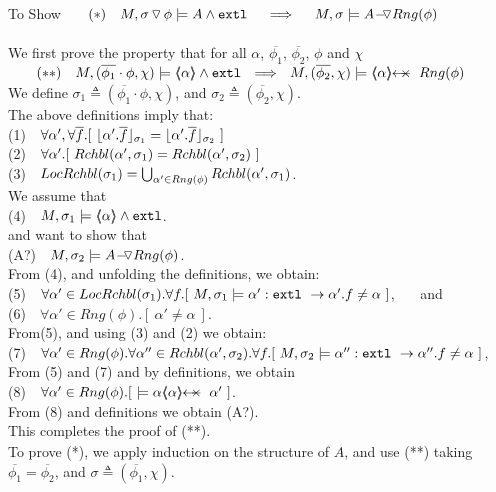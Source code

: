 $~$ \\
To Show \ \ \  $(*)\ \ \  M,  \PushSLong {\phi} {\sigma}   \models  A  \wedge \extThis    \ \  \ \  \Longrightarrow  \ \ \ \ M, \sigma \models \PushASLong  {Rng(\phi)} {A}$ 
\\ 
\SP \\
We first prove the property that for all $\alpha$,   $\overline {\phi_1}$, $\overline {\phi_2}$, $\phi$ and $\chi$\\
$\strut ~ \ \ \ \ \ (**)\ \ \    M, (\overline {\phi_1}\cdot\phi,\chi) \models \inside \alpha   \wedge \extThis \ \ \Longrightarrow \ \ M, (\overline {\phi_2},\chi) \models \protectedFrom \alpha {Rng(\phi)} $
\\
We define $\sigma_1 \triangleq (\overline {\phi_1}\cdot \phi,\chi)$, and  $\sigma_2 \triangleq (\overline {\phi_2},\chi) $.\\
The above definitions imply that: \\
\SP (1)\ \ $\forall \alpha',\forall \overline f.[\  \interpret {\sigma_1} {\alpha'.\overline f} =  \interpret {\sigma_2} {\alpha'.\overline f}\ ]$\\
\SP (2)\ \ $\forall \alpha'.[\  \Relevant {\alpha'} {\sigma_1} = \Relevant {\alpha'} {\sigma_2}\ ]$\\
\SP (3)\ \ $\LRelevantO {\sigma_1} = \bigcup_{\alpha'\in Rng(\phi)} \Relevant {\alpha'} {\sigma_1}$.\\
We   assume that\\
\SP (4)\ \  $M, \sigma_1 \models \inside \alpha \wedge \extThis$.\\
and want to show that\\
\SP (A?)\ \ $M, \sigma_2 \models \PushASLong  {Rng(\phi)} {A}$.\\
From (4), and unfolding the definitions, we obtain:\\
\SP (5)\ \  $\forall \alpha'\in \LRelevantO {\sigma_1}.\forall f.[ \   M, \sigma_1 \models \alpha':\prg{extl}\ \rightarrow \alpha'.f  \neq \alpha\ ]$, \ \ \ and\\
\SP (6)\ \ $\forall \alpha'\in Rng (\phi). [ \ \alpha'\neq \alpha \ ]$.\\
From(5), and using (3) and (2) we obtain:
\\
\SP (7)\ \  $\forall \alpha'\in Rng(\phi).\forall \alpha'' \in\Relevant {\alpha'} {\sigma_2}.\forall f.[ \   M, \sigma_2 \models \alpha'':\prg{extl}\ \rightarrow \alpha''.f  \neq \alpha\ ]$,
From (5) and (7) and by definitions, we obtain
\\
\SP (8)\ \  $\forall \alpha'\in Rng (\phi).[ \   \models \alpha \protectedFrom \alpha {\alpha'}\ ]$.\\
From (8) and definitions we obtain (A?).\\
This completes the proof of (**).
 $\strut ~ \ $\\
 To prove (*), we apply induction on the structure of $A$, and use (**) taking   $\overline {\phi_1} = \overline { \phi_2}$, and $\sigma \triangleq (\overline {\phi_1},\chi).$

